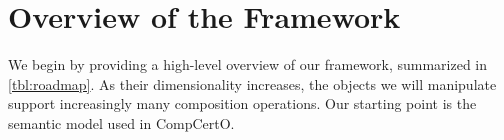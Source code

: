\documentclass[acmsmall,screen,review,anonymous]{acmart}
\begin{document}
%
%
%
%
%
%
%
%


\section{Overview of the Framework} %

We begin by providing a high-level overview of our framework,
summarized in \autoref{tbl:roadmap}.
As their dimensionality increases,
the objects we will manipulate
support increasingly many composition operations.
Our starting point is the semantic model used in CompCertO.
\end{document}

